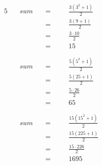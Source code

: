 \begin{alignat*}{5}
&\,&sum\quad&=\quad&&\frac{3(3^2+1)}{2}\\
&\,&\,&=&&\frac{3(9+1)}{2}\\
&\,&\,&=&&\frac{3\cdot10}{2}\\
&\,&\,&=&&15\\
\\ \\
&\,&sum\quad&=&&\frac{5(5^2+1)}{2}\\
&\,&\,&=&&\frac{5(25+1)}{2}\\
&\,&\,&=&&\frac{5\cdot26}{2}\\
&\,&\,&=&&65\\
\\ \\
&\,&sum\quad&=&&\frac{15(15^2+1)}{2}\\
&\,&\,&=&&\frac{15(225+1)}{2}\\
&\,&\,&=&&\frac{15\cdot226}{2}\\
&\,&\,&=&&1695
\end{alignat*}
